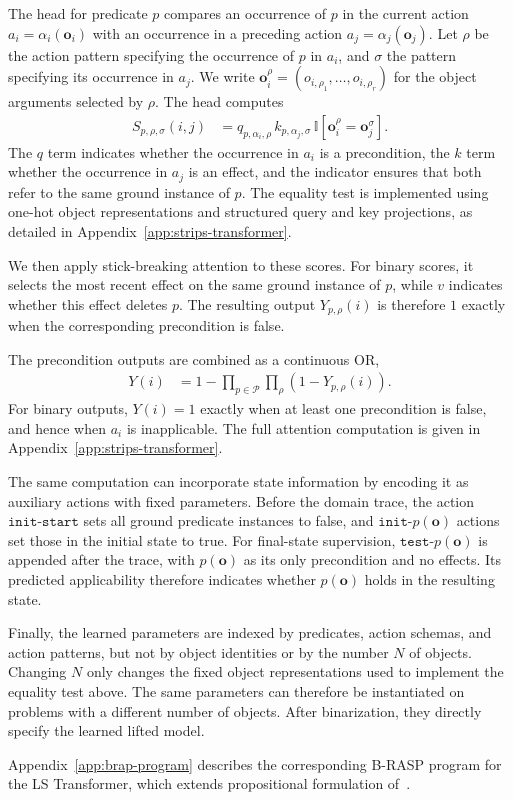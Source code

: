 The head for predicate $p$ compares an occurrence of $p$ in the current action
$a_i=\alpha_i(\mathbf{o}_i)$ with an occurrence in a preceding action
$a_j=\alpha_j(\mathbf{o}_j)$. Let $\rho$ be the action pattern specifying the
occurrence of $p$ in $a_i$, and $\sigma$ the pattern specifying its occurrence
in $a_j$. We write
$\mathbf{o}_i^\rho=(o_{i,\rho_1},\ldots,o_{i,\rho_r})$
for the object arguments selected by $\rho$. The head computes
\begin{align}\label{eq:scores}
S_{p,\rho,\sigma}(i,j)
&=
q_{p,\alpha_i,\rho}\,
k_{p,\alpha_j,\sigma}\,
\mathbb{I}\!\left[
\mathbf{o}_i^\rho=\mathbf{o}_j^\sigma
\right].
\end{align}
The $q$ term indicates whether the occurrence in $a_i$ is a precondition, the $k$ term whether the occurrence in $a_j$ is an effect, and the indicator ensures that both refer to the same ground instance of $p$. The equality test is implemented using one-hot object representations and structured query and key projections, as detailed in Appendix~\ref{app:strips-transformer}.

We then apply stick-breaking attention to these scores. For binary scores, it selects the most recent effect on the same ground instance of $p$, while $v$ indicates whether this effect deletes $p$. The resulting output $Y_{p,\rho}(i)$ is therefore $1$ exactly when the corresponding precondition is false.

The precondition outputs are combined as a continuous OR,
\begin{align}
Y(i)
&=
1-\prod_{p\in\mathcal{P}}\prod_{\rho}
\left(1-Y_{p,\rho}(i)\right).
\end{align}
For binary outputs, $Y(i)=1$ exactly when at least one precondition is false,
and hence when $a_i$ is inapplicable.
The full attention computation is given in
Appendix~\ref{app:strips-transformer}.

The same computation can incorporate state information by encoding it as auxiliary actions with fixed parameters. Before the domain trace, the action $\texttt{init-start}$ sets all ground predicate instances to false, and $\texttt{init-}p(\mathbf{o})$ actions set those in the initial state to true. For final-state supervision, $\texttt{test-}p(\mathbf{o})$ is appended after the trace, with $p(\mathbf{o})$ as its only precondition and no effects. Its predicted applicability therefore indicates whether $p(\mathbf{o})$ holds in the resulting state.

Finally, the learned parameters are indexed by predicates, action schemas,
and action patterns, but not by object identities or by the number $N$ of
objects. Changing $N$ only changes the fixed object representations used to
implement the equality test above. The same parameters can therefore be
instantiated on problems with a different number of objects. After
binarization, they directly specify the learned lifted \strips model.

Appendix~\ref{app:brap-program} describes the corresponding B-RASP program for the LS Transformer, which extends propositional formulation of~\citet{nunez2026strips}.